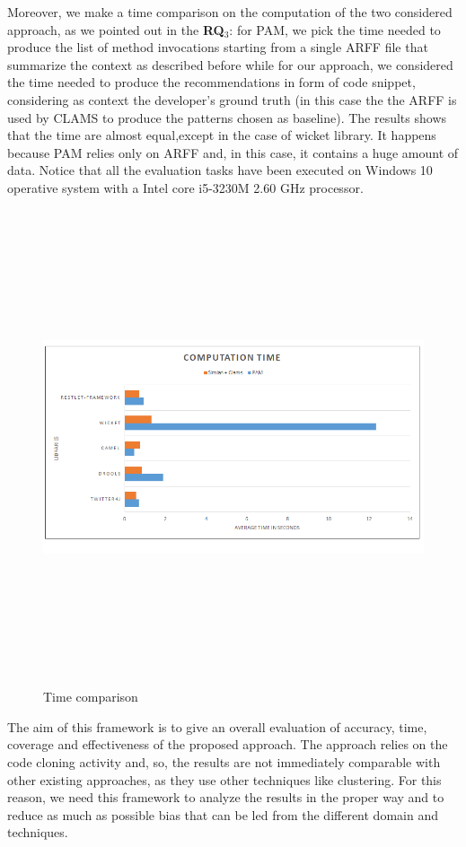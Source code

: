 Moreover, we make a time comparison on the computation of the two considered approach, as we pointed out in the \textbf{RQ$_3$}: for PAM, we pick the time needed to produce the list of method invocations starting from a single ARFF file that summarize the context as described before while for our approach, we considered the time needed to produce the recommendations in form of code snippet, considering as context the developer's ground truth (in this case the the ARFF is used by CLAMS to produce the patterns chosen as baseline). The results shows that the time are almost equal,except in the case of wicket library. It happens because PAM relies only on ARFF and, in this case, it contains a huge amount of data. Notice that all the evaluation tasks have been executed on Windows 10 operative system with a Intel core i5-3230M 2.60 GHz processor.

\begin{figure}[!h]
\includegraphics[width=14cm,height=14cm,keepaspectratio]{images/time.png}
\centering
\caption{Time comparison}
\label{fig:cmd}
\end{figure}

The aim of this framework is to give an overall evaluation of accuracy, time, coverage and effectiveness of the proposed approach. The approach relies on the code cloning activity and, so, the results are not immediately comparable with other existing approaches, as they use other techniques like clustering. For this reason, we need this framework to analyze the results in the proper way and to reduce as much as possible bias that can be led from the different domain and techniques. 
